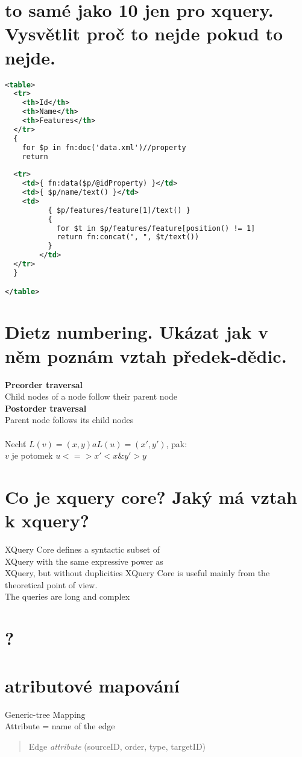 \documentclass[a4paper,titlepage]{article}
\begin{document}
\section{to samé jako 10 jen pro xquery. Vysvětlit proč to nejde pokud to nejde.  }
		\begin{lstlisting}[language=XML]
<table>
  <tr>
    <th>Id</th>
    <th>Name</th>
    <th>Features</th>
  </tr>
  {
    for $p in fn:doc('data.xml')//property
    return
      
  <tr>
    <td>{ fn:data($p/@idProperty) }</td>
    <td>{ $p/name/text() }</td>
    <td>
          { $p/features/feature[1]/text() }
          {
            for $t in $p/features/feature[position() != 1]
            return fn:concat(", ", $t/text())
          }
        </td>
  </tr>
  }

</table>
	\end{lstlisting}

\section{Dietz numbering. Ukázat jak v něm poznám vztah předek-dědic.  }
	\textbf{Preorder traversal}\\
		Child nodes of a node follow their parent node\\
	\textbf{Postorder traversal}\\
		Parent node follows its child nodes\\
	\\
	 Nechť $L(v)=(x, y) a L(u)=(x', y')$, pak:\\
        $v$ je potomek $u <=> x' < x \& y' > y$

\section{Co je xquery core? Jaký má vztah k xquery?  }
	XQuery Core defines a syntactic subset of\\
	XQuery with the same expressive power as\\
	XQuery, but without duplicities
	XQuery Core is useful mainly from the theoretical point of view.\\
		The queries are long and complex


\section{?}
\section{atributové mapování }
	Generic-tree Mapping \\
		Attribute = name of the edge\\
		\begin{quote}
		Edge \textit{attribute} (sourceID, order, type, targetID)
		\end{quote}
	
\end{document}
